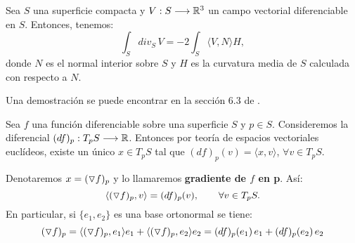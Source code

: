 \begin{theorem}\label{divergesurfaces}
Sea $S$ una superficie compacta y $V: S \longrightarrow \mathbb{R}^3$ un campo vectorial diferenciable en $S$. Entonces, tenemos:
%
\begin{equation*}
    \int_S div_S \, V = -2 \int_S \langle V,N \rangle H,
\end{equation*}
%
donde $N$ es el normal interior sobre $S$ y $H$ es la curvatura media de $S$ calculada con respecto a $N$.
\end{theorem}

Una demostración se puede encontrar en la sección 6.3 de \cite{montielrosbook}.

\begin{definition}[Gradiente]
Sea $f$ una función diferenciable sobre una superficie $S$ y $p \in S$. Consideremos la diferencial $(df)_p: T_pS \longrightarrow \mathbb{R}$. Entonces por teoría de espacios vectoriales euclídeos, existe un único $x \in T_pS$ tal que $(df)_p(v)=  \langle x,v \rangle $, $\forall v \in T_pS$.

Denotaremos $x= (\triangledown f)_p $ y lo llamaremos \textbf{gradiente de $f$ en p}. Así:
%
\begin{equation*}
    \langle (\triangledown f)_p, v \rangle = (df)_p(v), \qquad \forall v \in T_pS.
\end{equation*}
%
En particular, si $\{e_1, e_2\}$ es una base ortonormal se tiene:
%
\begin{equation*}
     (\triangledown f)_p = \langle  (\triangledown f)_p , e_1 \rangle e_1 + \langle (\triangledown f)_p, e_2 \rangle e_2 = (df)_p(e_1) \, e_1 + (df)_p(e_2) \, e_2
\end{equation*}
\end{definition}

